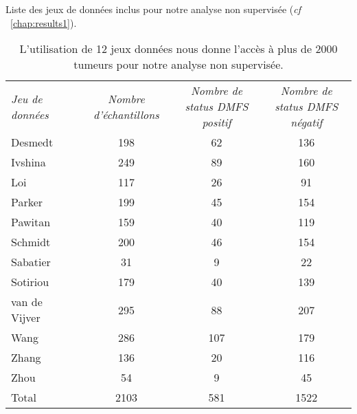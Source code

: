			\begin{table}
				\begin{center}
					\caption{Liste des jeux de données inclus pour notre analyse non supervisée (\emph{cf} ~\ref{chap:results1}).}
					\begin{tabular}{lcccc}
						\toprule
						\multirow{2}{3cm}{\emph{Jeu de données}}	&  & \multirow{2}{3cm}{\centering\emph{Nombre d'échantillons}}	& \multirow{2}{3cm}{\centering\emph{Nombre de status \acs{DMFS} positif}} & \multirow{2}{3cm}{\centering\emph{Nombre de status \acs{DMFS} négatif}} \\
						&&&&\\
						\midrule
						Desmedt			& \citep{Desmedt2008}		& 198	& 62	&	136		\\
						Ivshina			& \citep{Ivshina2006}		& 249	& 89	&	160		\\
						Loi				& \citep{Loi2008}			& 117	& 26	&	91		\\
						Parker			& \citep{Parker2009}		& 199	& 45	&	154		\\
						Pawitan			& \citep{Pawitan2005}		& 159	& 40	&	119		\\
						Schmidt			& \citep{Schmidt2008}		& 200	& 46	&	154		\\
						Sabatier		& \citep{Sabatier2011}		& 31	& 9		&	22		\\
						Sotiriou		& \citep{Sotiriou2009}		& 179	& 40	&	139		\\
						van de Vijver	& \citep{vandevijver2002}	& 295	& 88	&	207		\\
						Wang			& \citep{Wang2005}			& 286	& 107	&	179		\\
						Zhang			& \citep{Zhang2009a}		& 136	& 20	&	116		\\
						Zhou			& \citep{Zhou2007}			& 54	& 9		&	45		\\
						\midrule
						Total			&							& 2103	& 581	&	1522	\\
						\bottomrule
					\end{tabular}
					\label{tab:Met:DSNS}
					\vspace{5ex}
					\caption*{L'utilisation de 12 jeux données nous donne l'accès à plus de 2000 tumeurs pour notre analyse non supervisée.}
				\end{center}
			\end{table}


